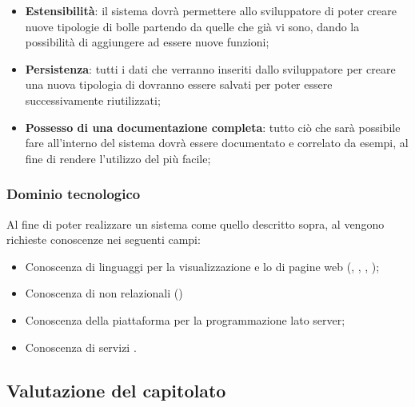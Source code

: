 \begin{itemize}

	\item \textbf{Estensibilità}: il sistema dovrà permettere allo sviluppatore di poter creare nuove tipologie di bolle partendo da quelle che già vi sono, dando la possibilità di aggiungere ad essere nuove funzioni;

	\item \textbf{Persistenza}: tutti i dati che verranno inseriti dallo sviluppatore per creare una nuova tipologia di  dovranno essere salvati per poter essere successivamente riutilizzati;
	
	\item \textbf{Possesso di una documentazione completa}: tutto ciò che sarà possibile fare all'interno del sistema dovrà essere documentato e correlato da esempi, al fine di rendere l'utilizzo del  più facile;
	
	

\end{itemize}


\subsubsection{Dominio tecnologico} 
Al fine di poter realizzare un sistema come quello descritto sopra, al  vengono richieste conoscenze nei seguenti campi:

\begin{itemize}

	\item Conoscenza di linguaggi per la visualizzazione e lo  di pagine web (, , , );

	\item Conoscenza di  non relazionali ()

	\item Conoscenza della piattaforma  per la programmazione lato server;
	
	\item Conoscenza di servizi .

\end{itemize}


\subsection{Valutazione del capitolato}
